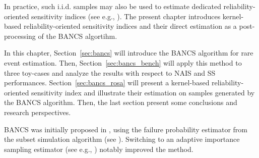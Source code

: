 In practice, such i.i.d. samples may also be used to estimate dedicated reliability-oriented sensitivity indices (see e.g., \citealp{chabridon2021global,marrel_chabridon_2021}). 
The present chapter introduces kernel-based reliability-oriented sensitivity indices and their direct estimation as a post-processing of the BANCS algortihm. 

In this chapter, Section~\ref{sec:bancs} will introduce the BANCS algorithm for rare event estimation. 
Then, Section~\ref{sec:bancs_bench} will apply this method to three toy-cases and analyze the results with respect to NAIS and SS performances. 
Section~\ref{sec:bancs_rosa} will present a kernel-based reliability-oriented sensitivity index and illustrate their estimation on samples generated by the BANCS algorithm. 
Then, the last section present some conclusions and research perspectives.

\begin{remark}
    BANCS was initially proposed in \citet{fekhari_ICASP_2023}, using the failure probability estimator from the subset simulation algorithm (see ). 
    Switching to an adaptive importance sampling estimator (see e.g., ) notably improved the method.    
\end{remark}


